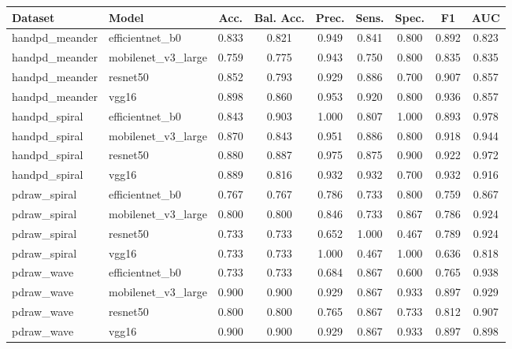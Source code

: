 \begin{tabular}{llccccccc}
\toprule
Dataset & Model & Acc. & Bal. Acc. & Prec. & Sens. & Spec. & F1 & AUC \\
\midrule
handpd_meander & efficientnet_b0 & 0.833 & 0.821 & 0.949 & 0.841 & 0.800 & 0.892 & 0.823 \\
handpd_meander & mobilenet_v3_large & 0.759 & 0.775 & 0.943 & 0.750 & 0.800 & 0.835 & 0.835 \\
handpd_meander & resnet50 & 0.852 & 0.793 & 0.929 & 0.886 & 0.700 & 0.907 & 0.857 \\
handpd_meander & vgg16 & 0.898 & 0.860 & 0.953 & 0.920 & 0.800 & 0.936 & 0.857 \\
handpd_spiral & efficientnet_b0 & 0.843 & 0.903 & 1.000 & 0.807 & 1.000 & 0.893 & 0.978 \\
handpd_spiral & mobilenet_v3_large & 0.870 & 0.843 & 0.951 & 0.886 & 0.800 & 0.918 & 0.944 \\
handpd_spiral & resnet50 & 0.880 & 0.887 & 0.975 & 0.875 & 0.900 & 0.922 & 0.972 \\
handpd_spiral & vgg16 & 0.889 & 0.816 & 0.932 & 0.932 & 0.700 & 0.932 & 0.916 \\
pdraw_spiral & efficientnet_b0 & 0.767 & 0.767 & 0.786 & 0.733 & 0.800 & 0.759 & 0.867 \\
pdraw_spiral & mobilenet_v3_large & 0.800 & 0.800 & 0.846 & 0.733 & 0.867 & 0.786 & 0.924 \\
pdraw_spiral & resnet50 & 0.733 & 0.733 & 0.652 & 1.000 & 0.467 & 0.789 & 0.924 \\
pdraw_spiral & vgg16 & 0.733 & 0.733 & 1.000 & 0.467 & 1.000 & 0.636 & 0.818 \\
pdraw_wave & efficientnet_b0 & 0.733 & 0.733 & 0.684 & 0.867 & 0.600 & 0.765 & 0.938 \\
pdraw_wave & mobilenet_v3_large & 0.900 & 0.900 & 0.929 & 0.867 & 0.933 & 0.897 & 0.929 \\
pdraw_wave & resnet50 & 0.800 & 0.800 & 0.765 & 0.867 & 0.733 & 0.812 & 0.907 \\
pdraw_wave & vgg16 & 0.900 & 0.900 & 0.929 & 0.867 & 0.933 & 0.897 & 0.898 \\
\bottomrule
\end{tabular}
